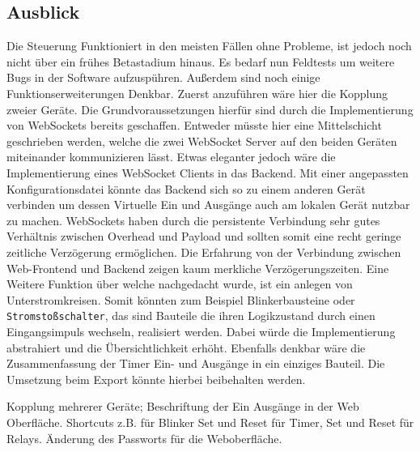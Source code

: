  \subsection{Ausblick}
 Die Steuerung Funktioniert in den meisten Fällen ohne Probleme, ist jedoch noch nicht über ein frühes Betastadium hinaus. Es bedarf nun Feldtests um weitere Bugs in der Software aufzuspühren. Außerdem sind noch einige Funktionserweiterungen Denkbar. Zuerst anzuführen wäre hier die Kopplung zweier Geräte. Die Grundvoraussetzungen hierfür sind durch die Implementierung  von WebSockets bereits geschaffen. Entweder müsste hier eine Mittelschicht geschrieben werden, welche die zwei WebSocket Server auf den beiden Geräten miteinander kommunizieren lässt. Etwas eleganter jedoch wäre die Implementierung eines WebSocket Clients in das Backend. Mit einer angepassten Konfigurationsdatei könnte das Backend sich so zu einem anderen Gerät verbinden um dessen Virtuelle Ein und Ausgänge auch am lokalen Gerät nutzbar zu machen. WebSockets haben durch die persistente Verbindung sehr gutes Verhältnis zwischen Overhead und Payload und sollten somit eine recht geringe zeitliche Verzögerung ermöglichen. Die Erfahrung von der Verbindung zwischen Web-Frontend und Backend zeigen kaum merkliche Verzögerungszeiten. Eine Weitere Funktion über welche nachgedacht wurde, ist ein anlegen von Unterstromkreisen. Somit könnten zum Beispiel Blinkerbausteine oder \texttt{Stromstoßschalter}, das sind Bauteile die ihren Logikzustand durch einen Eingangsimpuls wechseln, realisiert werden. Dabei würde die Implementierung abstrahiert und die Übersichtlichkeit erhöht. Ebenfalls denkbar wäre die Zusammenfassung der Timer Ein- und Ausgänge in ein einziges Bauteil. Die Umsetzung beim Export könnte hierbei beibehalten werden. 
  
 Kopplung mehrerer Geräte;
 Beschriftung der Ein Ausgänge in der Web Oberfläche. 
 Shortcuts z.B. für Blinker
 Set und Reset für Timer,
 Set und Reset für Relays.
 Änderung des Passworts für die Weboberfläche.
 
 
 
\clearpage